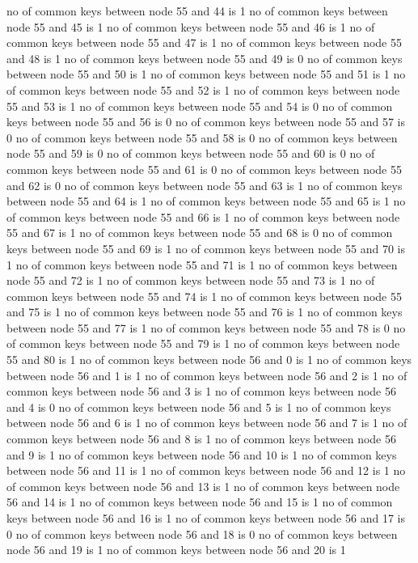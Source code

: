 no of common keys between node 55 and 44 is 1
no of common keys between node 55 and 45 is 1
no of common keys between node 55 and 46 is 1
no of common keys between node 55 and 47 is 1
no of common keys between node 55 and 48 is 1
no of common keys between node 55 and 49 is 0
no of common keys between node 55 and 50 is 1
no of common keys between node 55 and 51 is 1
no of common keys between node 55 and 52 is 1
no of common keys between node 55 and 53 is 1
no of common keys between node 55 and 54 is 0
no of common keys between node 55 and 56 is 0
no of common keys between node 55 and 57 is 0
no of common keys between node 55 and 58 is 0
no of common keys between node 55 and 59 is 0
no of common keys between node 55 and 60 is 0
no of common keys between node 55 and 61 is 0
no of common keys between node 55 and 62 is 0
no of common keys between node 55 and 63 is 1
no of common keys between node 55 and 64 is 1
no of common keys between node 55 and 65 is 1
no of common keys between node 55 and 66 is 1
no of common keys between node 55 and 67 is 1
no of common keys between node 55 and 68 is 0
no of common keys between node 55 and 69 is 1
no of common keys between node 55 and 70 is 1
no of common keys between node 55 and 71 is 1
no of common keys between node 55 and 72 is 1
no of common keys between node 55 and 73 is 1
no of common keys between node 55 and 74 is 1
no of common keys between node 55 and 75 is 1
no of common keys between node 55 and 76 is 1
no of common keys between node 55 and 77 is 1
no of common keys between node 55 and 78 is 0
no of common keys between node 55 and 79 is 1
no of common keys between node 55 and 80 is 1
no of common keys between node 56 and 0 is 1
no of common keys between node 56 and 1 is 1
no of common keys between node 56 and 2 is 1
no of common keys between node 56 and 3 is 1
no of common keys between node 56 and 4 is 0
no of common keys between node 56 and 5 is 1
no of common keys between node 56 and 6 is 1
no of common keys between node 56 and 7 is 1
no of common keys between node 56 and 8 is 1
no of common keys between node 56 and 9 is 1
no of common keys between node 56 and 10 is 1
no of common keys between node 56 and 11 is 1
no of common keys between node 56 and 12 is 1
no of common keys between node 56 and 13 is 1
no of common keys between node 56 and 14 is 1
no of common keys between node 56 and 15 is 1
no of common keys between node 56 and 16 is 1
no of common keys between node 56 and 17 is 0
no of common keys between node 56 and 18 is 0
no of common keys between node 56 and 19 is 1
no of common keys between node 56 and 20 is 1
